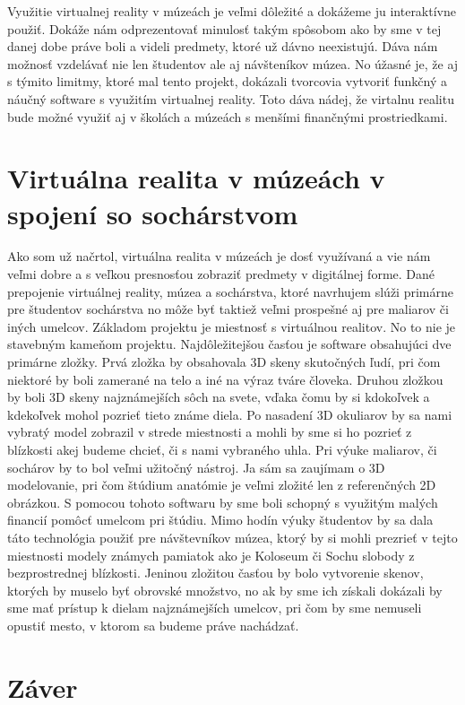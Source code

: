 \documentclass[10pt,twoside,slovak,a4paper]{article}
\begin{document}
Využitie virtualnej reality v múzeách je veľmi dôležité a dokážeme ju interaktívne použiť. Dokáže nám odprezentovať minulosť takým spôsobom ako by sme v tej danej dobe práve boli a videli predmety, ktoré už dávno neexistujú.  Dáva nám možnosť vzdelávať nie len študentov ale aj návšteníkov múzea. No úžasné je, že aj s týmito limitmy, ktoré mal tento projekt, dokázali tvorcovia vytvoriť funkčný a náučný software s využitím virtualnej reality. Toto dáva nádej, že virtalnu realitu bude možné využiť aj v školách a múzeách s menšími finančnými prostriedkami.

\section{Virtuálna realita v múzeách v spojení so sochárstvom} \label{produkt}

Ako som už načrtol, virtuálna realita v múzeách je dosť využívaná a vie nám veľmi dobre a s veľkou presnosťou zobraziť predmety v digitálnej forme. Dané prepojenie virtuálnej reality, múzea a sochárstva, ktoré navrhujem slúži primárne pre študentov sochárstva no môže byť taktiež veľmi prospešné aj pre maliarov či iných umelcov. Základom projektu je miestnosť s virtuálnou realitov. No to nie je stavebným kameňom projektu. Najdôležitejšou časťou je software obsahujúci dve primárne zložky. Prvá zložka by obsahovala 3D skeny skutočných ľudí, pri čom niektoré by boli zamerané na telo a iné na výraz tváre človeka. Druhou zložkou by boli 3D skeny najznámejších sôch na svete, vďaka čomu by si kdokoľvek a kdekoľvek mohol pozrieť tieto známe diela. Po nasadení 3D okuliarov by sa nami vybratý model zobrazil v strede miestnosti a mohli by sme si ho pozrieť z blízkosti akej budeme chcieť, či s nami vybraného uhla. Pri výuke maliarov, či sochárov by to bol veľmi užitočný nástroj. Ja sám sa zaujímam o 3D modelovanie, pri čom štúdium anatómie je veľmi zložité len z referenčných 2D obrázkou. S pomocou tohoto softwaru by sme boli schopný s využitým malých financií pomôcť umelcom pri štúdiu. Mimo hodín výuky študentov by sa dala táto technológia použiť pre návštevníkov múzea, ktorý by si mohli prezrieť v tejto miestnosti modely známych pamiatok ako je Koloseum či Sochu slobody z bezprostrednej blízkosti. Jeninou zložitou časťou by bolo vytvorenie skenov, ktorých by muselo byť obrovské množstvo, no ak by sme ich získali dokázali by sme mať prístup k dielam najznámejších umelcov, pri čom by sme nemuseli opustiť mesto, v ktorom sa budeme práve nachádzať. 

\section{Záver} \label{zaver} %






\end{document}
